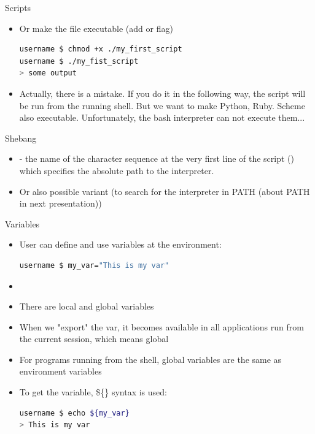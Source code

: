 \documentclass[usenames,dvipsnames,10pt,aspectratio=169]{beamer}
\begin{document}
\begin{frame}[fragile]{Scripts}
    \begin{itemize}
        \item Or make the file executable (add  or  flag)
        \begin{lstlisting}[language=bash, style=shellstyle]
username $ chmod +x ./my_first_script
username $ ./my_fist_script
> some output
        \end{lstlisting}
        \item Actually, there is a mistake. If you do it in the following way, the script will be run from the running shell. But we want to make Python, Ruby. Scheme also executable. Unfortunately, the bash interpreter can not execute them...
    \end{itemize}
\end{frame}

\begin{frame}{Shebang}
    \begin{itemize}
        \item {} - the name of the character sequence at the very first line of the script () which specifies the absolute path to the interpreter.
        
        \item Or also possible variant (to search for the interpreter in PATH (about PATH in next presentation))
        
    \end{itemize}
\end{frame}

\begin{frame}[fragile]{Variables}
    \begin{itemize}
        \item  User can define and use variables at the environment:
        \begin{lstlisting}[language=Bash, style=shellstyle]
username $ my_var="This is my var"
        \end{lstlisting}
        \item {}
        \item There are local and global variables
        \item When we "export" the var, it becomes available in all applications run from the current session, which means global 
        \item For programs running from the shell, global variables are the same as environment variables
        \item To get the variable, \$\{\} syntax is used:
        \begin{lstlisting}[language=Bash, style=shellstyle]
username $ echo ${my_var}
> This is my var
        \end{lstlisting}
    \end{itemize}
\end{frame}
\end{document}
